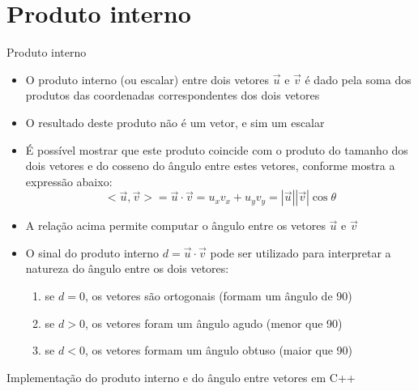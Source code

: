 \section{Produto interno}

\begin{frame}[fragile]{Produto interno}

    \begin{itemize}
        \item O produto interno (ou escalar) entre dois vetores $\vec{u}$ e $\vec{v}$ é dado pela 
        soma dos produtos das coordenadas correspondentes dos dois vetores
        \pause

        \item O resultado deste produto não é um vetor, e sim um escalar
        \pause

        \item É possível mostrar que este produto coincide com o produto do tamanho dos dois 
            vetores e do cosseno do ângulo entre estes vetores, conforme mostra a expressão abaixo:
        \[
            <\vec{u}, \vec{v}> = \vec{u} \cdot \vec{v} = u_xv_x + u_yv_y = |\vec{u}||\vec{v}|\cos \theta
        \]
        \pause

        \item A relação acima permite computar o ângulo entre os vetores $\vec{u}$ e $\vec{v}$
        \pause

        \item O sinal do produto interno $d = \vec{u}\cdot\vec{v}$ pode ser utilizado para interpretar a natureza do ângulo entre os dois vetores:
        \pause

        \begin{enumerate}
            \item se $d = 0$, os vetores são ortogonais (formam um ângulo de 90\textdegree)
        \pause
            \item se $d > 0$, os vetores foram um ângulo agudo (menor que 90\textdegree)
        \pause
            \item se $d < 0$, os vetores formam um ângulo obtuso (maior que 90\textdegree)
        \end{enumerate}
    \end{itemize}

\end{frame}

\begin{frame}[fragile]{Implementação do produto interno e do ângulo entre vetores em C++}


\end{frame}

